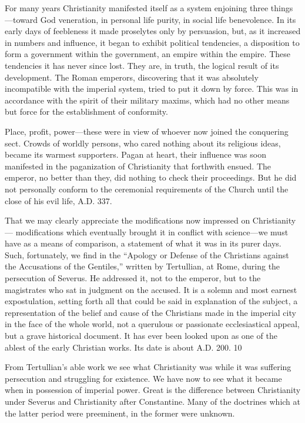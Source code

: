 For many years Christianity manifested itself as a system enjoining three things—toward
God veneration, in personal life purity, in social life benevolence. In its early days of
feebleness it made proselytes only by persuasion, but, as it increased in numbers and
influence, it began to exhibit political tendencies, a disposition to form a government within
the government, an empire within the empire. These tendencies it has never since lost. They
are, in truth, the logical result of its development. The Roman emperors, discovering that it
was absolutely incompatible with the imperial system, tried to put it down by force. This was
in accordance with the spirit of their military maxims, which had no other means but force
for the establishment of conformity.

Place, profit, power—these were in view of whoever now joined the conquering sect. Crowds
of worldly persons, who cared nothing about its religious ideas, became its warmest
supporters. Pagan at heart, their influence was soon manifested in the paganization of
Christianity that forthwith ensued. The emperor, no better than they, did nothing to check
their proceedings. But he did not personally conform to the ceremonial requirements of the
Church until the close of his evil life, A.D. 337.

That we may clearly appreciate the modifications now impressed on Christianity—
modifications which eventually brought it in conflict with science—we must have as a means
of comparison, a statement of what it was in its purer days. Such, fortunately, we find in the
``Apology or Defense of the Christians against the Accusations of the Gentiles,'' written by
Tertullian, at Rome, during the persecution of Severus. He addressed it, not to the emperor,
but to the magistrates who sat in judgment on the accused. It is a solemn and most earnest
expostulation, setting forth all that could be said in explanation of the subject, a
representation of the belief and cause of the Christians made in the imperial city in the face
of the whole world, not a querulous or passionate ecclesiastical appeal, but a grave historical
document. It has ever been looked upon as one of the ablest of the early Christian works. Its
date is about A.D. 200. 10

From Tertullian's able work we see what Christianity was while it was suffering persecution
and struggling for existence. We have now to see what it became when in possession of
imperial power. Great is the difference between Christianity under Severus and Christianity
after Constantine. Many of the doctrines which at the latter period were preeminent, in the
former were unknown.

